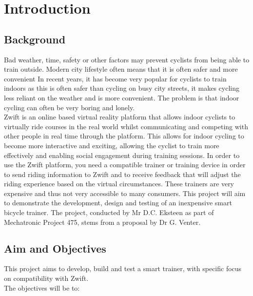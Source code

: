 
\chapter{Introduction}

\section{Background}
Bad weather, time, safety or other factors may prevent cyclists from being able to train outside.
Modern city lifestyle often means that it is often safer and more convenient 
In recent years, it has become very popular for cyclists to train indoors as this is often safer than cycling on busy city streets, it makes cycling less reliant on the weather and is more convenient. The problem is that indoor cycling can often be very boring and lonely. \\
Zwift is an online based virtual reality platform that allows indoor cyclists to virtually ride courses in the real world whilst communicating and competing with other people in real time through the platform. This allows for indoor cycling to become more interactive and exciting, allowing the cyclist to train more effectively and enabling social engagement during training sessions.
In order to use the Zwift platform, you need a compatible trainer or training device in order to send riding information to Zwift and to receive feedback that will adjust the riding experience based on the virtual circumstances. These trainers are very expensive and thus not very accessible to many consumers.
This project will aim to demonstrate the development, design and testing of an inexpensive smart bicycle trainer. The project, conducted by Mr D.C. Eksteen as part of Mechatronic Project 475, stems from a proposal by Dr G. Venter.

\section{Aim and Objectives}

This project aims to develop, build and test a smart trainer, with specific focus on compatibility with Zwift.\\
The objectives will be to: 

